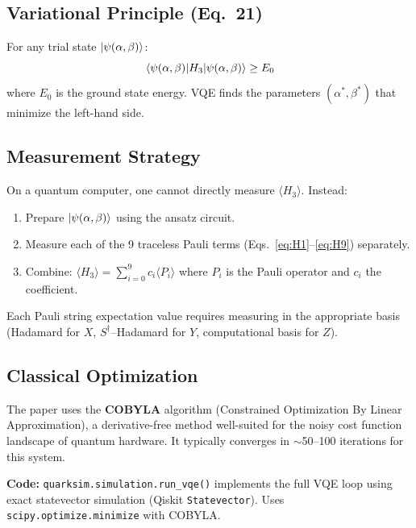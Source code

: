 \documentclass[11pt,a4paper]{article}
\begin{document}
\subsection{Variational Principle (Eq.~21)}

For any trial state $\ket{\psi(\alpha,\beta)}$:
\begin{equation}
  \mel{\psi(\alpha,\beta)}{H_3}{\psi(\alpha,\beta)} \geq E_0
\end{equation}
where $E_0$ is the ground state energy. VQE finds the parameters $(\alpha^*, \beta^*)$ that minimize the left-hand side.

\subsection{Measurement Strategy}

On a quantum computer, one cannot directly measure $\langle H_3 \rangle$. Instead:
\begin{enumerate}[nosep]
  \item Prepare $\ket{\psi(\alpha,\beta)}$ using the ansatz circuit.
  \item Measure each of the 9 traceless Pauli terms (Eqs.~\ref{eq:H1}--\ref{eq:H9}) separately.
  \item Combine: $\langle H_3 \rangle = \sum_{i=0}^{9} c_i \langle P_i \rangle$ where $P_i$ is the Pauli operator and $c_i$ the coefficient.
\end{enumerate}

Each Pauli string expectation value requires measuring in the appropriate basis (Hadamard for $X$, $S^\dagger$--Hadamard for $Y$, computational basis for $Z$).

\subsection{Classical Optimization}

The paper uses the \textbf{COBYLA} algorithm (Constrained Optimization By Linear Approximation), a derivative-free method well-suited for the noisy cost function landscape of quantum hardware. It typically converges in $\sim$50--100 iterations for this system.

\vspace{0.3em}
\noindent\textbf{Code:} \texttt{quarksim.simulation.run\_vqe()} implements the full VQE loop using exact statevector simulation (Qiskit \texttt{Statevector}). Uses \texttt{scipy.optimize.minimize} with COBYLA.


\end{document}
